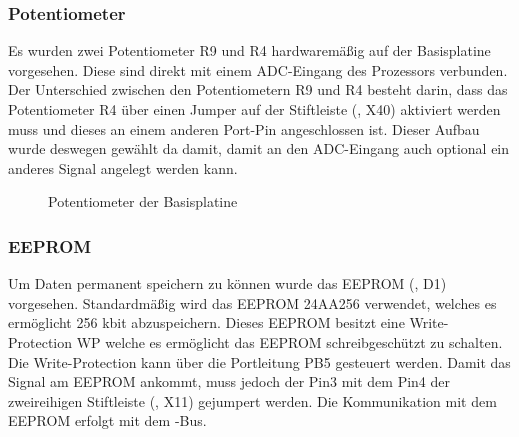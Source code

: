 \subsubsection{Potentiometer}
Es wurden zwei Potentiometer R9 und R4 hardwaremäßig auf der \gls{Basisplatine} vorgesehen. Diese sind direkt mit einem \gls{ADC}-Eingang des Prozessors verbunden. Der Unterschied zwischen den Potentiometern R9 und R4 besteht darin, dass das Potentiometer R4 über einen Jumper auf der Stiftleiste (, X40) aktiviert werden muss und dieses an einem anderen Port-Pin angeschlossen ist. Dieser Aufbau wurde deswegen gewählt da damit, damit an den \gls{ADC}-Eingang auch optional ein anderes Signal angelegt werden kann. 

\begin{figure}[htb]
    \centering
    \qquad
    \qquad
    \qquad
    \caption[Potentiometer der Basisplatine]{Potentiometer der \gls{Basisplatine}}
    \label{fig:basisplatine-poti}
\end{figure}

\subsubsection{EEPROM}
Um Daten permanent speichern zu können wurde das EEPROM (, D1) vorgesehen. Standardmäßig wird das EEPROM 24AA256 verwendet, welches es ermöglicht 256 kbit abzuspeichern. Dieses EEPROM besitzt eine Write-Protection WP welche es ermöglicht das EEPROM schreibgeschützt zu schalten. Die Write-Protection kann über die Portleitung PB5 gesteuert werden. Damit das Signal am EEPROM ankommt, muss jedoch der Pin3 mit dem Pin4 der zweireihigen Stiftleiste (, X11) gejumpert werden. Die Kommunikation mit dem EEPROM erfolgt mit dem \IIC{}-Bus.


